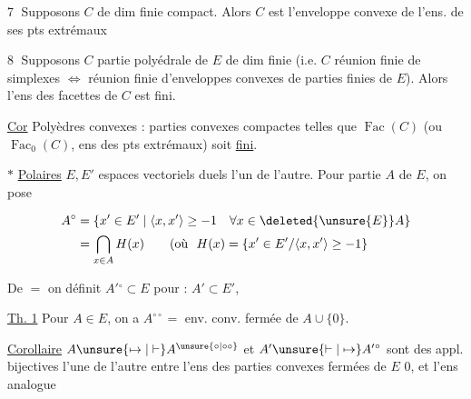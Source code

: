 
\textcircled{7} Supposons $C$ de  dim finie compact. Alors $C$ est l'enveloppe convexe de l'ens. de ses pts extrémaux

\textcircled{8} Supposons $C$ partie polyédrale de $E$ de dim finie (i.e. $C$ réunion finie de simplexes $\Longleftrightarrow$ réunion finie d'enveloppes convexes de parties finies de $E$). Alors l'ens des facettes de $C$ est fini.

\uline{Cor} Polyèdres convexes : parties convexes compactes telles que $\operatorname{Fac}(C)$ (ou $\operatorname{Fac}_0(C)$, ens des pts extrémaux) soit \uline{fini}.


$\ast$ \uline{Polaires} $E,E'$ espaces vectoriels duels l'un de l'autre. Pour partie $A$ de $E$, on pose

\[
\begin{aligned}
A^{\circ}&=\{x'\in E'\mid\langle x,x'\rangle\geq-1\quad\forall x\in\deleted{\unsure{E}} A\}\\
&=\bigcap_{x\in A} H(x)\qquad(\text{où }\ H(x)=\{x'\in E'/\langle x,x'\rangle\geq-1\}
\end{aligned}
\]

De $=$ on définit $A'{}^\circ\subset E$ pour : $A'\subset E'$,

\uline{Th. 1} Pour $A\in E$, on a $A^{\circ\circ}=$ env. conv. fermée de $A\cup\{0\}$.

\uline{Corollaire} $A\unsure{\mapsto|\vdash} A^{\unsure{\circ|\circ\circ}}$ et $A'\unsure{\vdash|\mapsto} A'{}^\circ$ sont des appl. bijectives  l'une de l'autre entre l'ens des parties convexes fermées de $E$  $0$, et l'ens analogue
